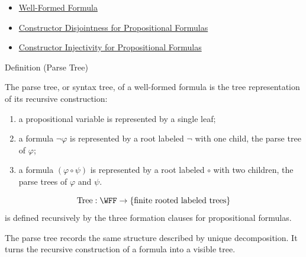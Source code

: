 \begin{dependencies}
\begin{itemize}
  \item \hyperref[def:well-formed-formula]{Well-Formed Formula}
  \item \hyperref[lem:constructor-disjointness-propositional-formulas]{Constructor Disjointness for Propositional Formulas}
  \item \hyperref[lem:constructor-injectivity-propositional-formulas]{Constructor Injectivity for Propositional Formulas}
\end{itemize}
\end{dependencies}
\begin{definitionbox}{Definition (Parse Tree)}
\begin{definition}
\label{def:parse-tree-propositional-logic}
The parse tree, or syntax tree, of a well-formed formula is the tree representation of its recursive construction:
\begin{enumerate}
\item a propositional variable is represented by a single leaf;
\item a formula \(\neg\varphi\) is represented by a root labeled \(\neg\) with one child, the parse tree of \(\varphi\);
\item a formula \((\varphi\circ\psi)\) is represented by a root labeled \(\circ\) with two children, the parse trees of \(\varphi\) and \(\psi\).
\end{enumerate}
\end{definition}
\end{definitionbox}

\begin{remark*}
\[
\operatorname{Tree}:\WFF\to\{\text{finite rooted labeled trees}\}
\]
is defined recursively by the three formation clauses for propositional formulas.
\end{remark*}

\begin{remark*}[Interpretation]
The parse tree records the same structure described by unique decomposition. It turns the recursive construction of a formula into a visible tree.
\end{remark*}

